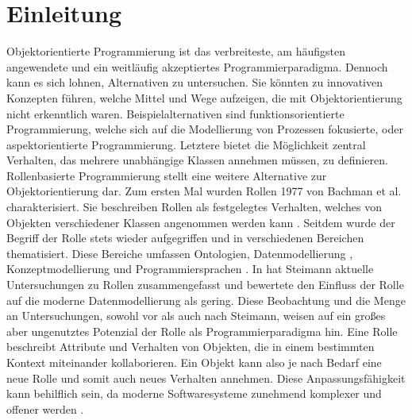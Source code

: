 \documentclass[conference]{IEEEtran}
\begin{document}
\section{Einleitung}
Objektorientierte Programmierung ist das verbreiteste, am häufigsten angewendete und ein weitläufig akzeptiertes Programmierparadigma. Dennoch kann es sich lohnen, Alternativen zu untersuchen. Sie könnten zu innovativen Konzepten führen, welche Mittel und Wege aufzeigen, die mit Objektorientierung nicht erkenntlich waren. Beispielalternativen sind funktionsorientierte Programmierung, welche sich auf die Modellierung von Prozessen fokusierte, oder aspektorientierte Programmierung. Letztere bietet die Möglichkeit zentral Verhalten, das mehrere unabhängige Klassen annehmen müssen, zu definieren. \\ Rollenbasierte Programmierung stellt eine weitere Alternative zur Objektorientierung dar. Zum ersten Mal wurden Rollen 1977 von Bachman et al. charakterisiert. Sie beschreiben Rollen als festgelegtes Verhalten, welches von Objekten verschiedener Klassen angenommen werden kann \cite{bachman}. Seitdem wurde der Begriff der Rolle stets wieder aufgegriffen und in verschiedenen Bereichen thematisiert. Diese Bereiche umfassen Ontologien\cite{loebe2005abstract}\cite{guarino2009overview}, Datenmodellierung \cite{halpin2005orm}, Konzeptmodellierung \cite{hennicker2015model} und Programmiersprachen \cite{ubayashi2000roleep}. In \cite{steimann2000represantation} hat Steimann aktuelle Untersuchungen zu Rollen zusammengefasst und bewertete den Einfluss der Rolle auf die moderne Datenmodellierung als gering. Diese Beobachtung und die Menge an Untersuchungen, sowohl vor als auch nach Steimann, weisen auf ein großes aber ungenutztes Potenzial der Rolle als Programmierparadigma hin. Eine Rolle beschreibt Attribute und Verhalten von Objekten, die in einem bestimmten Kontext miteinander kollaborieren. Ein Objekt kann also je nach Bedarf eine neue Rolle und somit auch neues Verhalten annehmen. Diese Anpassungsfähigkeit kann behilflich sein, da moderne Softwaresysteme zunehmend komplexer und offener werden \cite{murer2008managed}. \\
\end{document}
